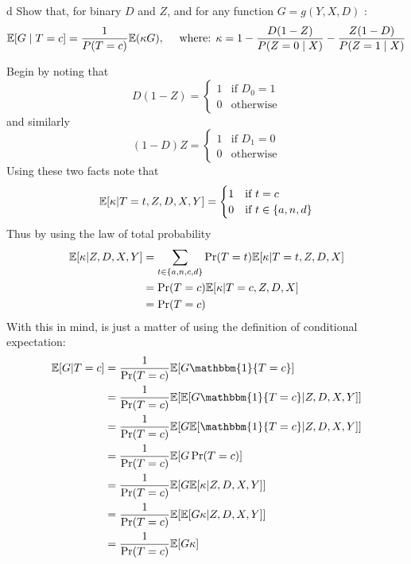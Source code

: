 \documentclass{article}
\begin{document}
\begin{problem}{d}
Show that, for binary $D$ and $Z$, and for any function $G=g(Y, X, D)$ :
\begin{align*}
\mathbb{E}[G \mid T=c]=\frac{1}{P(T=c)} \mathbb{E}(\kappa G), \quad \text { where: } \kappa=1-\frac{D(1-Z)}{P(Z=0 \mid X)}-\frac{Z(1-D)}{P(Z=1 \mid X)}
\end{align*}
\end{problem}
\begin{solution}
Begin by noting that 
\begin{equation*}
    D(1-Z) = \begin{cases}
    1 &\mbox{if } D_0 = 1 \\ 
    0 &\mbox{otherwise}
    \end{cases}
\end{equation*}
and similarly 
\begin{equation*}
    (1-D)Z = \begin{cases}
    1 &\mbox{if } D_1 = 0 \\ 
    0 &\mbox{otherwise}
    \end{cases}
\end{equation*}
Using these two facts note that 
\begin{equation*}
    \mathbb{E}[\kappa\vert T=t,Z,D,X,Y]= \begin{cases}
    1 &\mbox{if } t = c \\ 
    0 &\mbox{if } t\in\{a,n,d\}
    \end{cases}
\end{equation*}
Thus by using the law of total probability 
\begin{align*}
    \mathbb{E}[\kappa\vert Z,D,X,Y] &=\sum_{t\in\{a,n,c,d\}} \Pr(T=t)  \mathbb{E}[\kappa\vert T=t,Z,D,X] \\ 
    &= \Pr(T=c) \mathbb{E}[\kappa\vert T=c,Z,D,X] \\ 
    &= \Pr(T=c)
\end{align*}
With this in mind, is just a matter of using the definition of conditional expectation:
\begin{align*}
    \E[G\vert T=c] &= \frac{1}{\Pr(T=c)} \E[G\mathbbm{1}\{T=c\}] \\ 
    &= \frac{1}{\Pr(T=c)} \E[\E[G\mathbbm{1}\{T=c\}\vert Z,D,X,Y]] \\ 
    &= \frac{1}{\Pr(T=c)}\E[G\E[\mathbbm{1}\{T=c\}\vert Z,D,X,Y]] \\ 
    &= \frac{1}{\Pr(T=c)}\E[G\Pr(T=c)] \\ 
     &= \frac{1}{\Pr(T=c)}\E[G \E[\kappa\vert Z,D,X,Y]] \\ 
      &= \frac{1}{\Pr(T=c)}\E[\E[G\kappa\vert Z,D,X,Y]] \\ 
      &= \frac{1}{\Pr(T=c)}\E[G\kappa] \\ 
\end{align*}
\end{solution}
\end{document}
